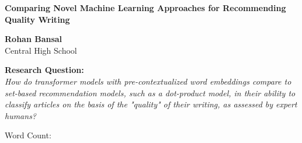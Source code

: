 \begin{titlepage}
    \begin{center}
        \vspace*{1cm}
            
        \huge
        \textbf{Comparing Novel Machine Learning Approaches for Recommending Quality Writing}
            
        \vspace{0.5cm}

        \vspace{1.5cm}
        
        \large
        \textbf{Rohan Bansal} \\
        Central High School
            
        \vfill
        
        \Large
        \textbf{Research Question: } \\
        \large
        \emph{How do transformer models with pre-contextualized word embeddings compare to set-based recommendation models, such as a dot-product model, in their ability to classify articles on the basis of the "quality" of their writing, as assessed by expert humans?}
            
        \vspace{0.8cm}
            
        \Large
        Word Count:
            
    \end{center}
\end{titlepage}